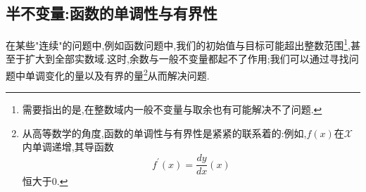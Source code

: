 \subsection{半不变量:函数的单调性与有界性}
在某些"连续"的问题中,例如函数问题中,我们的初始值与目标可能超出整数范围\footnote{需要指出的是,在整数域内一般不变量与取余也有可能解决不了问题.},甚至于扩大到全部实数域.这时,余数与一般不变量都起不了作用;我们可以通过寻找问题中单调变化的量以及有界的量\footnote{从高等数学的角度,函数的单调性与有界性是紧紧的联系着的:例如,$f(x)$在$\mathcal{X}$内单调递增,其导函数$$f^{\prime}(x)=\dfrac{dy
}{dx}(x)$$恒大于0.}从而解决问题.